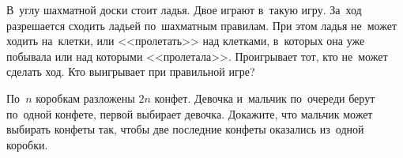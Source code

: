 \begin{problems}
\item
В~углу шахматной доски стоит ладья.
Двое играют в~такую игру.
За~ход разрешается сходить ладьей по~шахматным правилам.
При этом ладья не~может ходить на~клетки, или <<пролетать>> над клетками,
в~которых она уже побывала или над которыми <<пролетала>>.
Проигрывает тот, кто не~может сделать ход.
Кто выигрывает при правильной игре?

\item
По~$n$ коробкам разложены $2n$ конфет.
Девочка и~мальчик по~очереди берут по~одной конфете, первой выбирает девочка.
Докажите, что мальчик может выбирать конфеты так, чтобы две последние конфеты
оказались из~одной коробки.

\end{problems}

